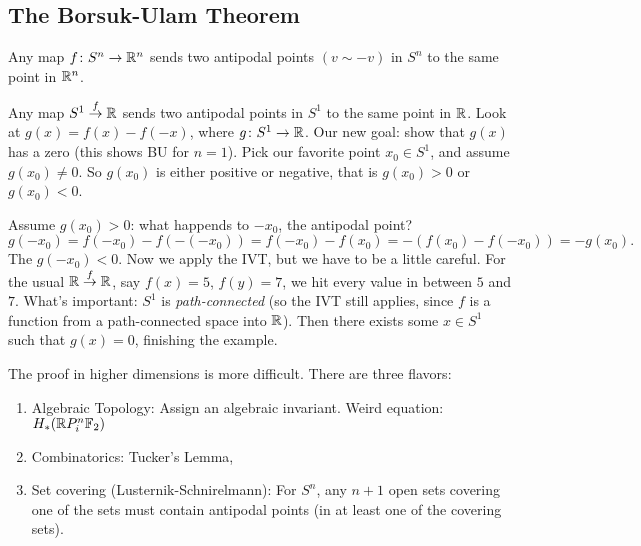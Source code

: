 \subsection{The Borsuk-Ulam Theorem}
\begin{theorem}
    Any map $f \colon S^{n} \to \mathbb{R}^{n}$ sends two antipodal points $(v \sim-v)$ in $S^{n}$ to the same point in $\mathbb{R}^{n}$.
\end{theorem}
\begin{example}
    Any map $S^{1} \overset{f}{\to }\mathbb{R}$ sends two antipodal points in $S^{1} $ to the same point in $\mathbb{R}$. Look at $g(x)=f(x)-f(-x)$, where  $g \colon S^{1}  \to \mathbb{R}$. Our new goal: show that $g(x)$ has a zero (this shows BU for $n=1$). Pick our favorite point $x_0\in S^{1} $, and assume $g(x_0)\neq 0$. So $g(x_0)$ is either positive or negative, that is $g(x_0)>0$ or $g(x_0)<0$.

    Assume $g(x_0)>0$: what happends to $-x_0$, the antipodal point? \[
        g(-x_0)=f(-x_0)-f(-(-x_0))=f(-x_0)-f(x_0)=-(f(x_0)-f(-x_0))=-g(x_0).
    \] The $g(-x_0)<0$. Now we apply the IVT, but we have to be a little careful. For the usual $\mathbb{R} \overset{f}{\to } \mathbb{R}$, say $f(x)=5$, $f(y)=7$, we hit every value in between $5$ and $7$. What's important: $S^{1} $ is \emph{path-connected} (so the IVT still applies, since $f$ is a function from a path-connected space into $\mathbb{R}$). Then there exists some $x\in S^{1} $ such that $g(x)=0$, finishing the example.
\end{example}
The proof in higher dimensions is more difficult. There are three flavors:
\begin{enumerate}
    \item Algebraic Topology: Assign an algebraic invariant. Weird equation: $H_{*}(\mathbb{R} P_i^{n}\mathbb{F}_2)$
    \item Combinatorics: Tucker's Lemma,
    \item Set covering (Lusternik-Schnirelmann): For $S^{n}$, any $n+1$ open sets covering one of the sets must contain antipodal points (in at least one of the covering sets).
\end{enumerate}
